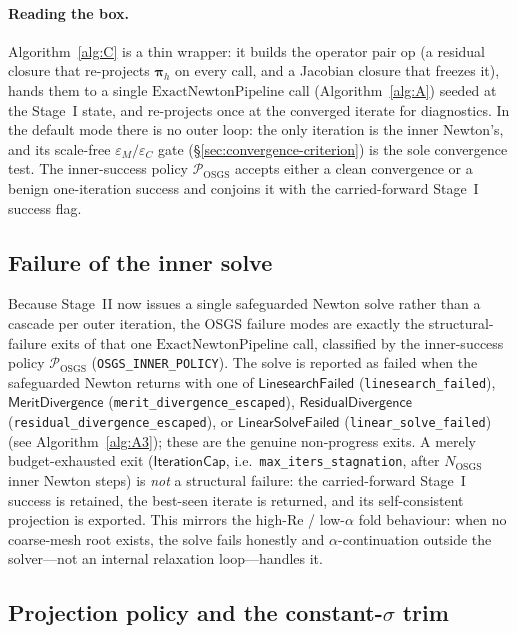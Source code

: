 \documentclass{article}
\newcommand{\code}[1]{\texttt{\small #1}}
\begin{document}
\paragraph{Reading the box.}  Algorithm~\ref{alg:C} is a thin wrapper:
it builds the operator pair $\mathrm{op}$ (a residual closure that
re-projects $\boldsymbol{\pi}_h$ on every call, and a Jacobian closure
that freezes it), hands them to a single $\mathrm{ExactNewtonPipeline}$
call (Algorithm~\ref{alg:A}) seeded at the Stage~I state, and re-projects
once at the converged iterate for diagnostics. In the default mode there is no outer loop:
the only iteration is the inner Newton's, and its scale-free
$\varepsilon_M/\varepsilon_C$ gate (§\ref{sec:convergence-criterion}) is the sole convergence test. The inner-success policy
$\mathcal{P}_{\mathrm{OSGS}}$ accepts either a clean convergence or a
benign one-iteration success and conjoins it with the carried-forward
Stage~I success flag.

\subsection{Failure of the inner solve}
\label{sec:osgs-inner-failure}

Because Stage~II now issues a single safeguarded Newton solve rather
than a cascade per outer iteration, the OSGS failure modes are exactly
the structural-failure exits of that one
$\mathrm{ExactNewtonPipeline}$ call, classified by the inner-success
policy $\mathcal{P}_{\mathrm{OSGS}}$ (\code{OSGS\_INNER\_POLICY}). The
solve is reported as failed when the safeguarded Newton returns with one
of $\mathsf{LinesearchFailed}$ (\code{linesearch\_failed}),
$\mathsf{MeritDivergence}$ (\code{merit\_divergence\_escaped}),
$\mathsf{ResidualDivergence}$ (\code{residual\_divergence\_escaped}), or
$\mathsf{LinearSolveFailed}$ (\code{linear\_solve\_failed}) (see Algorithm~\ref{alg:A3});
these are the genuine non-progress exits. A merely budget-exhausted exit
($\mathsf{IterationCap}$, i.e.\ \code{max\_iters\_stagnation}, after
$N_{\mathrm{OSGS}}$ inner Newton steps) is
\emph{not} a structural failure: the carried-forward Stage~I success is
retained, the best-seen iterate is returned, and its self-consistent
projection is exported. This mirrors the high-Re / low-$\alpha$ fold
behaviour: when no coarse-mesh root exists, the solve fails honestly and
$\alpha$-continuation outside the solver---not an internal relaxation
loop---handles it.

\subsection{Projection policy and the constant-$\sigma$ trim}
\label{sec:proj-policy}
\end{document}
